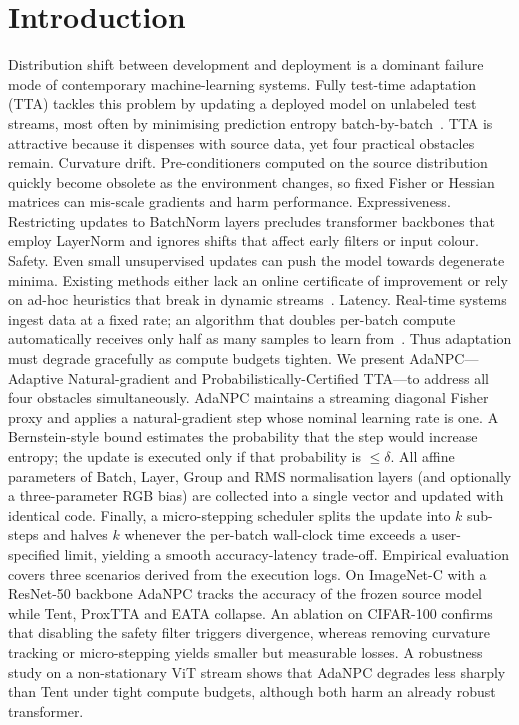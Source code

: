 \documentclass{article} %
\begin{document}
\section{Introduction}\label{sec:intro}
Distribution shift between development and deployment is a dominant failure mode of contemporary machine-learning systems. Fully test-time adaptation (TTA) tackles this problem by updating a deployed model on unlabeled test streams, most often by minimising prediction entropy batch-by-batch~\cite{wang-2020-tent}. TTA is attractive because it dispenses with source data, yet four practical obstacles remain.
Curvature drift. Pre-conditioners computed on the source distribution quickly become obsolete as the environment changes, so fixed Fisher or Hessian matrices can mis-scale gradients and harm performance.
Expressiveness. Restricting updates to BatchNorm layers precludes transformer backbones that employ LayerNorm and ignores shifts that affect early filters or input colour.
Safety. Even small unsupervised updates can push the model towards degenerate minima. Existing methods either lack an online certificate of improvement or rely on ad-hoc heuristics that break in dynamic streams~\cite{niu-2023-towards,hoang-2023-persistent}.
Latency. Real-time systems ingest data at a fixed rate; an algorithm that doubles per-batch compute automatically receives only half as many samples to learn from~\cite{alfarra-2023-evaluation}. Thus adaptation must degrade gracefully as compute budgets tighten.
We present AdaNPC---Adaptive Natural-gradient and Probabilistically-Certified TTA---to address all four obstacles simultaneously. AdaNPC maintains a streaming diagonal Fisher proxy and applies a natural-gradient step whose nominal learning rate is one. A Bernstein-style bound estimates the probability that the step would increase entropy; the update is executed only if that probability is \(\leq \delta\). All affine parameters of Batch, Layer, Group and RMS normalisation layers (and optionally a three-parameter RGB bias) are collected into a single vector and updated with identical code. Finally, a micro-stepping scheduler splits the update into \(k\) sub-steps and halves \(k\) whenever the per-batch wall-clock time exceeds a user-specified limit, yielding a smooth accuracy-latency trade-off.
Empirical evaluation covers three scenarios derived from the execution logs. On ImageNet-C with a ResNet-50 backbone AdaNPC tracks the accuracy of the frozen source model while Tent, ProxTTA and EATA collapse. An ablation on CIFAR-100 confirms that disabling the safety filter triggers divergence, whereas removing curvature tracking or micro-stepping yields smaller but measurable losses. A robustness study on a non-stationary ViT stream shows that AdaNPC degrades less sharply than Tent under tight compute budgets, although both harm an already robust transformer.
\end{document}
